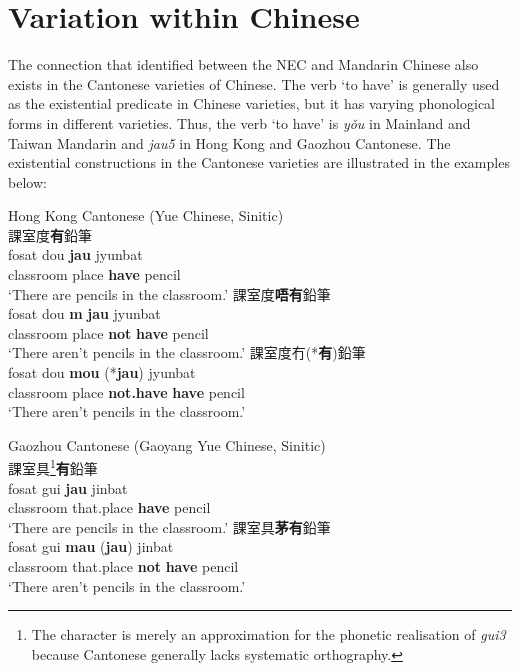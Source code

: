 \documentclass[output=paper]{langscibook}
\begin{document}
\section{Variation within Chinese}\label{s:lam5}

The connection that \citeauthor{Croft1991} identified between the NEC and Mandarin Chinese also exists in the Cantonese varieties of Chinese. The verb `to have' is generally used as the existential predicate in Chinese varieties, but it has varying phonological forms in different varieties. Thus, the verb `to have' is \textit{yǒu} in Mainland and Taiwan Mandarin and \textit{jau5} in Hong Kong and Gaozhou Cantonese. The existential constructions in the Cantonese varieties are illustrated in the examples below: 


\ea Hong Kong Cantonese (Yue Chinese, Sinitic) \label{ex:lam27}\\
  \ea 課室度\textbf{有}鉛筆 \label{ex:lam27a}\\
  	\gll fosat	dou	\textbf{jau} jyunbat\\
  	classroom place	\textbf{have} pencil\\
  	\glt `There are pencils in the classroom.'
  \ex 課室度\textbf{唔有}鉛筆 \label{ex:lam27b}\\
  	\gll *fosat	dou	\textbf{m} \textbf{jau} jyunbat\\
  	classroom place	\textbf{not} \textbf{have} pencil\\
  	\glt `There aren't pencils in the classroom.'
  \ex 課室度冇(*\textbf{有})鉛筆 \label{ex:lam27c}\\
  	\gll fosat	dou	\textbf{mou} (*\textbf{jau}) jyunbat\\
  	classroom	place	\textbf{not.have}	\textbf{have}	pencil\\
  	\glt `There aren't pencils in the classroom.'
\z \z
 
\ea Gaozhou Cantonese (Gaoyang Yue Chinese, Sinitic) \label{ex:lam28}\\
  \ea 課室具\footnote{The character is merely an approximation for the phonetic realisation of \textit{gui3} because Cantonese generally lacks systematic orthography.}\textbf{有}鉛筆 \label{ex:lam28a}\\
  	\gll fosat gui \textbf{jau} jinbat\\	
  	classroom that.place \textbf{have} pencil\\
  	\glt `There are pencils in the classroom.'
  \ex 課室具\textbf{茅有}鉛筆 \label{ex:lam28b}\\
  	\gll fosat gui \textbf{mau} (\textbf{jau}) jinbat\\
  	classroom that.place \textbf{not} \textbf{have} pencil\\
  	\glt `There aren't pencils in the classroom.'
\z \z
\end{document}
